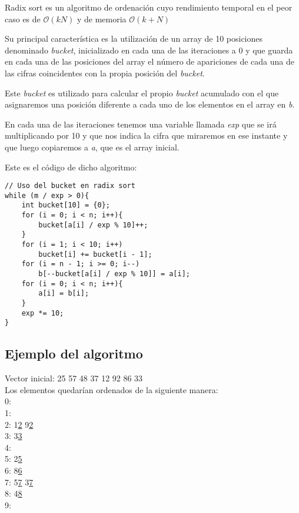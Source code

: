 Radix sort es un algoritmo de ordenación cuyo rendimiento temporal en el peor caso es de $\mathcal{O}(kN)$ y de memoria $\mathcal{O}(k + N)$

Su principal característica es la utilización de un array de 10 posiciones denominado \emph{bucket}, inicializado en cada una de las iteraciones a 0 y que guarda en cada una de las posiciones del array el número de apariciones de cada una de las cifras coincidentes con la propia posición del \emph{bucket}.

Este \emph{bucket} es utilizado para calcular el propio \emph{bucket} acumulado con el que asignaremos una posición diferente a cada uno de los elementos en el array en \emph{b}.

En cada una de las iteraciones tenemos una variable llamada \emph{exp} que se irá multiplicando por 10 y que nos indica la cifra que miraremos en ese instante y que luego copiaremos a \emph{a}, que es el array inicial.

Este es el código de dicho algoritmo:

\begin{lstlisting}
// Uso del bucket en radix sort
while (m / exp > 0){
	int bucket[10] = {0};
	for (i = 0; i < n; i++){
		bucket[a[i] / exp % 10]++;
	}
	for (i = 1; i < 10; i++)
		bucket[i] += bucket[i - 1];
	for (i = n - 1; i >= 0; i--)
		b[--bucket[a[i] / exp % 10]] = a[i];
	for (i = 0; i < n; i++){
		a[i] = b[i];
	}
	exp *= 10;
}
\end{lstlisting}


\subsection{Ejemplo del algoritmo}

Vector inicial: 25 57 48 37 12 92 86 33\\

Los elementos quedarían ordenados de la siguiente manera:\\
0:\\
1:\\
2: 1\underline{2} 9\underline{2}\\
3: 3\underline{3}\\
4:\\
5: 2\underline{5}\\
6: 8\underline{6}\\
7: 5\underline{7} 3\underline{7}\\
8: 4\underline{8}\\
9:\\

